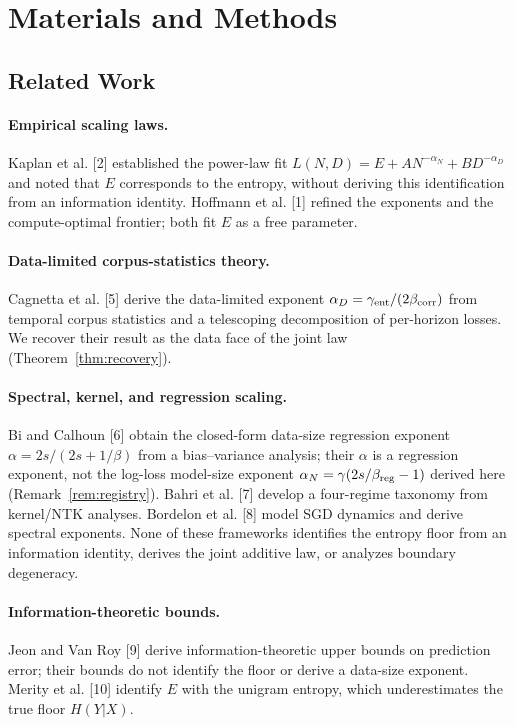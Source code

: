 \documentclass[entropy,article,submit,moreauthors,pdftex]{Definitions/mdpi}
\begin{document}


\section{Materials and Methods}
\label{sec:methods}

\subsection{Related Work}
\label{sec:related}

\paragraph{Empirical scaling laws.}
Kaplan et al. [2] established the power-law fit
$L(N,D)=E+AN^{-\alpha_N}+BD^{-\alpha_D}$ and noted that $E$ corresponds to
the entropy, without deriving this identification from an information identity.
Hoffmann et al. [1] refined the exponents and the compute-optimal frontier;
both fit $E$ as a free parameter.

\paragraph{Data-limited corpus-statistics theory.}
Cagnetta et al. [5] derive the data-limited exponent
$\alpha_D=\gamma_{\rm ent}/(2\beta_{\rm corr})$ from temporal corpus statistics
and a telescoping decomposition of per-horizon losses. We recover their result
as the data face of the joint law (Theorem~\ref{thm:recovery}).

\paragraph{Spectral, kernel, and regression scaling.}
Bi and Calhoun [6] obtain the closed-form data-size regression exponent
$\alpha=2s/(2s+1/\beta)$ from a bias--variance analysis; their $\alpha$ is a
regression exponent, not the log-loss model-size exponent
$\alpha_N=\gamma(2s/\beta_{\rm reg}-1)$ derived here
(Remark~\ref{rem:registry}). Bahri et al. [7] develop a four-regime taxonomy
from kernel/NTK analyses. Bordelon et al. [8] model SGD dynamics and
derive spectral exponents. None of these frameworks identifies the entropy
floor from an information identity, derives the joint additive law, or
analyzes boundary degeneracy.

\paragraph{Information-theoretic bounds.}
Jeon and Van Roy [9] derive information-theoretic upper bounds on prediction
error; their bounds do not identify the floor or derive a data-size exponent.
Merity et al. [10] identify $E$ with the unigram entropy,
which underestimates the true floor $H(Y|X)$.
\end{document}

